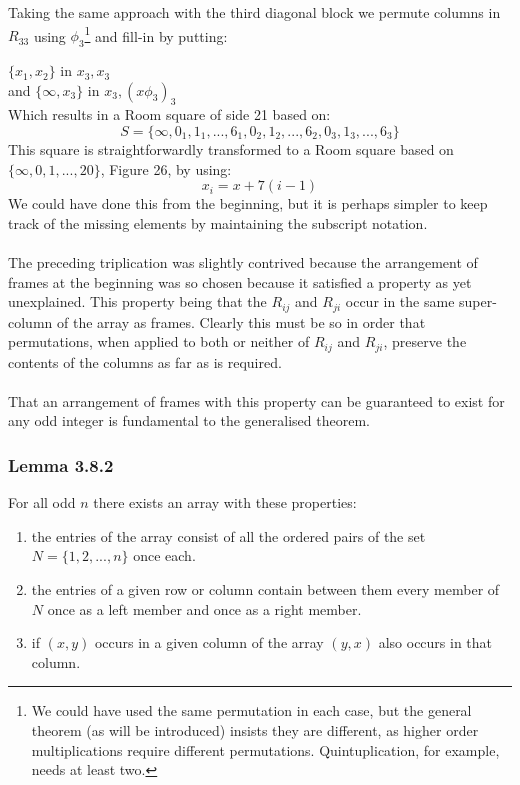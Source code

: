 \documentclass[
  12pt,
  a4paper]{book}
\begin{document}
Taking the same approach with the third diagonal block we permute
columns in \(R_{33}\) using \(\phi _3\)\footnote{We could have used the same permutation in each case, but the
  general theorem (as will be introduced) insists they are different,
  as higher order multiplications require different permutations.
  Quintuplication, for example, needs at least two.} and fill-in by putting:

\(\{x_1,x_2\}\) in \(x_3,x_3\)\\
and \(\{\infty,x_3\}\) in \(x_3,(x \phi _3)_3\)\\

Which results in a Room square of side 21 based on:
\[S = \{\infty,0_1,1_1,...,6_1,0_2,1_2,...,6_2,0_3,1_3,...,6_3\}\] This
square is straightforwardly transformed to a Room square based on
\(\{\infty,0,1,...,20\}\), Figure 26, by using: \[x_i=x+7(i-1)\] We could
have done this from the beginning, but it is perhaps simpler to keep
track of the missing elements by maintaining the subscript notation.\\
~\\
The preceding triplication was slightly contrived because the
arrangement of frames at the beginning was so chosen because it
satisfied a property as yet unexplained. This property being that the
\(R_{ij}\) and \(R_{ji}\) occur in the same super-column of the array as
frames. Clearly this must be so in order that permutations, when applied
to both or neither of \(R_{ij}\) and \(R_{ji}\), preserve the contents of
the columns as far as is required.\\
~\\
That an arrangement of frames with this property can be guaranteed to
exist for any odd integer is fundamental to the generalised theorem.

\hypertarget{lemma-3.8.2}{%
\subsubsection{Lemma 3.8.2}\label{lemma-3.8.2}}

For all odd \(n\) there exists an array with these properties:

\begin{enumerate}
\def\labelenumi{\arabic{enumi}.}
\item
  the entries of the array consist of all the ordered pairs of the set
  \(N=\{1,2,...,n\}\) once each.
\item
  the entries of a given row or column contain between them every
  member of \(N\) once as a left member and once as a right member.
\item
  if \((x,y)\) occurs in a given column of the array \((y,x)\) also occurs
  in that column.
\end{enumerate}
\end{document}
